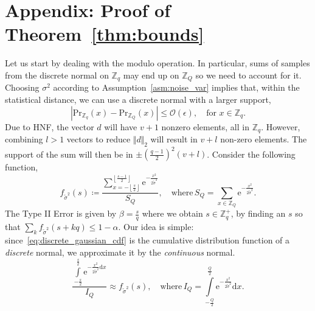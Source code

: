 \documentclass[journal, twoside, web]{ieeecolorpreprint}
\begin{document}
\section*{Appendix: Proof of Theorem~\ref{thm:bounds}}
Let us start by dealing with the modulo operation. In particular, sums of samples from the discrete normal on $\mathbb Z_q$ may end up on $\mathbb Z_Q$ so we need to account for it. Choosing $\sigma^2$ according to Assumption~\ref{asm:noise_var} implies that, within the statistical distance, we can use a discrete normal with a larger support,
    \begin{equation}\label{eq:temp_approx}
    \left \vert \mathrm{Pr}_{\mathbb{Z}_q}(x)- \mathrm{Pr}_{\mathbb{Z}_Q}(x)\right \vert \leq \mathcal{O}(\epsilon), \quad \text{for } x \in \mathbb{Z}_q.
    \end{equation}
Due to HNF, the vector $d$ will have $v+1$ nonzero elements, all in $\mathbb{Z}_q$. However, combining $l > 1$ vectors to reduce $\Vert d \Vert_2$ will result in $v+l$ non-zero elements. The support of the sum will then be in $\pm \left (\frac{q-1}{2} \right)^2(v+l)$. Consider the following function,\begin{equation}\label{eq:discrete_gaussian_cdf}
        f_{\tilde \sigma^2}(s) \coloneqq \frac{\sum \limits_{x = -\left \lfloor\frac{s}{2}\right \rfloor}^{\left \lfloor\frac{s-1}{2}\right \rfloor} \mathrm{e}^{-\frac{x^2}{2 \tilde \sigma^2}}}{S_Q}, \quad \text{where} \, S_Q=\sum \limits_{x \in \mathbb Z_Q} \mathrm{e}^{-\frac{x^2}{2 \tilde \sigma^2}}.
    \end{equation}
    The Type II Error is given by $\beta = \frac{s}{q}$ where we obtain $s \in \mathbb{Z}_q^+$, by finding an $s$ so that $\sum \limits_{k} f_{\tilde \sigma^2}(s+kq)\leq 1-\alpha$. Our idea is simple: since~\eqref{eq:discrete_gaussian_cdf} is the cumulative distribution function of a \emph{discrete} normal, we approximate it by the \emph{continuous} normal.
    \begin{equation*}
        \frac{\int \limits_{-\frac{s}{2}}^{\frac{s}{2}} \mathrm{e}^{-\frac{x^2}{2\tilde \sigma^2} \mathrm{d}x}}{I_Q} \approx f_{\tilde \sigma^2}(s), \quad \text{where} \, I_Q = \int \limits_{-\frac{Q}{2}}^{\frac{Q}{2}} \mathrm{e}^{-\frac{x^2}{2\tilde \sigma^2} }\mathrm{d}x. %
    \end{equation*}
\end{document}
